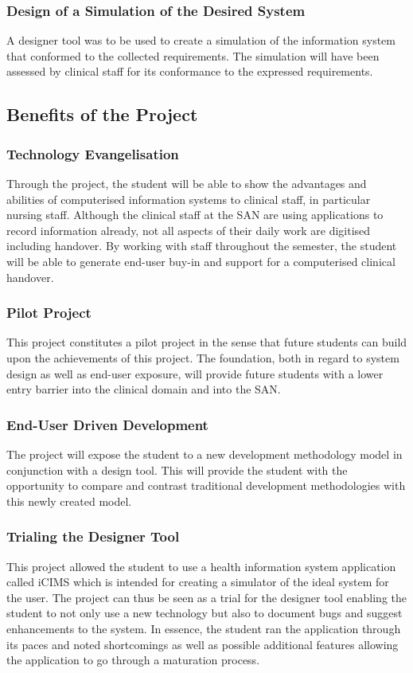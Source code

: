 \subsubsection{Design of a Simulation of the Desired System}
A designer tool was to be used to create a simulation of the information system that conformed to the collected requirements. The simulation will have been assessed by clinical staff for its conformance to the expressed requirements.

\subsection{Benefits of the Project}
\subsubsection{Technology Evangelisation}
Through the project, the student will be able to show the advantages and abilities of computerised information systems to clinical staff, in particular nursing staff. Although the clinical staff at the SAN are using applications to record information already, not all aspects of their daily work are digitised including handover. By working with staff throughout the semester, the student will be able to generate end-user buy-in and support for a computerised clinical handover.

\newpage
\subsubsection{Pilot Project}
This project constitutes a pilot project in the sense that future students can build upon the achievements of this project. The foundation, both in regard to system design as well as end-user exposure, will provide future students with a lower entry barrier into the clinical domain and into the SAN.

\subsubsection{End-User Driven Development}

The project will expose the student to a new development methodology model in conjunction with a design tool. This will provide the student with the opportunity to compare and contrast traditional development methodologies with this newly created model. 

\subsubsection{Trialing the Designer Tool}
This project allowed the student to use a health information system application called \gls{iCIMS} which is intended for creating a simulator of the ideal system for the user. The project can thus be seen as a trial for the designer tool enabling the student to not only use a new technology but also to document bugs and suggest enhancements to the system. In essence, the student ran the application through its paces and noted shortcomings as well as possible additional features allowing the application to go through a maturation process. 
